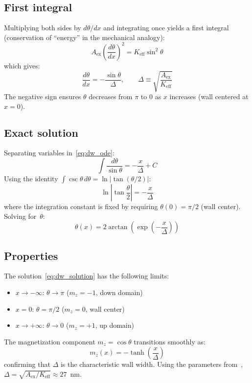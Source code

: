 \documentclass[11pt,a4paper]{article}
\newcommand{\Keff}{K_{\text{eff}}}
\newcommand{\Aex}{A_{\text{ex}}}
\begin{document}
\subsection*{First integral}

Multiplying both sides by $d\theta/dx$ and integrating once yields a
first integral (conservation of ``energy'' in the mechanical analogy):
%
\begin{equation}
\Aex \left(\frac{d\theta}{dx}\right)^{\!2}
    = \Keff \sin^2\!\theta
\end{equation}
%
which gives:
%
\begin{equation}\label{eq:dw_ode}
\frac{d\theta}{dx} = -\frac{\sin\theta}{\Delta},
\qquad
\Delta \equiv \sqrt{\frac{\Aex}{\Keff}}
\end{equation}
%
The negative sign ensures $\theta$ decreases from $\pi$ to $0$ as
$x$ increases (wall centered at $x = 0$).

\subsection*{Exact solution}

Separating variables in~\eqref{eq:dw_ode}:
%
\begin{equation}
\int \frac{d\theta}{\sin\theta} = -\frac{x}{\Delta} + C
\end{equation}
%
Using the identity
$\int \csc\theta \, d\theta
    = \ln|\tan(\theta/2)|$:
%
\begin{equation}
\ln\!\left|\tan\frac{\theta}{2}\right|
    = -\frac{x}{\Delta}
\end{equation}
%
where the integration constant is fixed by requiring $\theta(0)
= \pi/2$ (wall center). Solving for~$\theta$:
%
\begin{equation}\label{eq:dw_solution}
\boxed{\;
\theta(x) = 2\arctan\!\left(
    \exp\!\left(-\frac{x}{\Delta}\right)
\right)
\;}
\end{equation}

\subsection*{Properties}

The solution~\eqref{eq:dw_solution} has the following limits:
%
\begin{itemize}[nosep]
\item $x \to -\infty$: $\theta \to \pi$
    \quad ($m_z = -1$, down domain)
\item $x = 0$: $\theta = \pi/2$
    \quad ($m_z = 0$, wall center)
\item $x \to +\infty$: $\theta \to 0$
    \quad ($m_z = +1$, up domain)
\end{itemize}
%
The magnetization component $m_z = \cos\theta$ transitions
smoothly as:
%
\begin{equation}
m_z(x) = -\tanh\!\left(\frac{x}{\Delta}\right)
\end{equation}
%
confirming that $\Delta$ is the characteristic wall width.  Using
the parameters from~\cite{pham2024},
$\Delta = \sqrt{\Aex / \Keff} \approx 27$~nm.
\end{document}
